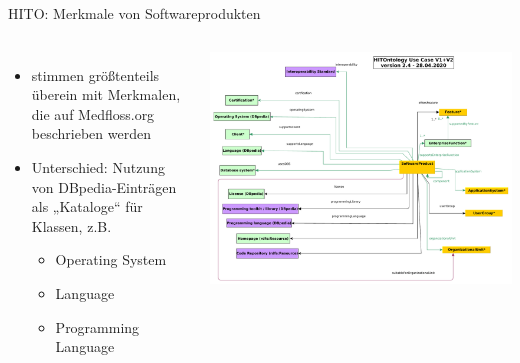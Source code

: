 \documentclass[aspectratio=1610,12pt]{beamer}
\begin{document}
\begin{frame}{HITO: Merkmale von Softwareprodukten}
\begin{columns}
  \begin{itemize}
    \item stimmen größtenteils überein mit Merkmalen, die auf Medfloss.org beschrieben werden
    \item Unterschied: Nutzung von DBpedia-Einträgen als „Kataloge“ für Klassen, z.B.
    \begin{itemize}
      \item Operating System
      \item Language
      \item Programming Language
    \end{itemize}
  \end{itemize}
\includegraphics[width=\textwidth]{img/excerpt2.pdf}
\end{columns}
\end{frame}
\end{document}
